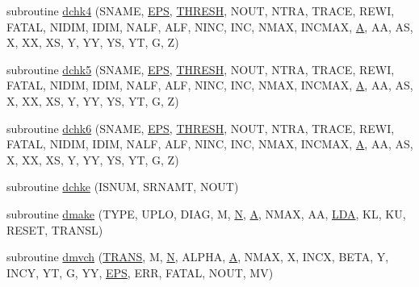 \begin{DoxyCompactItemize}
\item 
subroutine \hyperlink{dblat2_8f_aa8fdd6ba213f5c4bdf7f9ba5e6a1a0e7}{dchk4} (S\+N\+A\+M\+E, \hyperlink{tukey_8c_a6ebf6899d6c1c8b7b9d09be872c05aae}{E\+P\+S}, \hyperlink{zlaqgs_8c_a0656018abfc9fa2821827415f5d5ea57}{T\+H\+R\+E\+S\+H}, N\+O\+U\+T, N\+T\+R\+A, T\+R\+A\+C\+E, R\+E\+W\+I, F\+A\+T\+A\+L, N\+I\+D\+I\+M, I\+D\+I\+M, N\+A\+L\+F, A\+L\+F, N\+I\+N\+C, I\+N\+C, N\+M\+A\+X, I\+N\+C\+M\+A\+X, \hyperlink{classA}{A}, A\+A, A\+S, X, X\+X, X\+S, Y, Y\+Y, Y\+S, Y\+T, G, Z)
\item 
subroutine \hyperlink{dblat2_8f_aa5e1ff12141c4f3001796e7c26fb4f4a}{dchk5} (S\+N\+A\+M\+E, \hyperlink{tukey_8c_a6ebf6899d6c1c8b7b9d09be872c05aae}{E\+P\+S}, \hyperlink{zlaqgs_8c_a0656018abfc9fa2821827415f5d5ea57}{T\+H\+R\+E\+S\+H}, N\+O\+U\+T, N\+T\+R\+A, T\+R\+A\+C\+E, R\+E\+W\+I, F\+A\+T\+A\+L, N\+I\+D\+I\+M, I\+D\+I\+M, N\+A\+L\+F, A\+L\+F, N\+I\+N\+C, I\+N\+C, N\+M\+A\+X, I\+N\+C\+M\+A\+X, \hyperlink{classA}{A}, A\+A, A\+S, X, X\+X, X\+S, Y, Y\+Y, Y\+S, Y\+T, G, Z)
\item 
subroutine \hyperlink{dblat2_8f_add7fe1a057c0b80a7547c153f32fc0d3}{dchk6} (S\+N\+A\+M\+E, \hyperlink{tukey_8c_a6ebf6899d6c1c8b7b9d09be872c05aae}{E\+P\+S}, \hyperlink{zlaqgs_8c_a0656018abfc9fa2821827415f5d5ea57}{T\+H\+R\+E\+S\+H}, N\+O\+U\+T, N\+T\+R\+A, T\+R\+A\+C\+E, R\+E\+W\+I, F\+A\+T\+A\+L, N\+I\+D\+I\+M, I\+D\+I\+M, N\+A\+L\+F, A\+L\+F, N\+I\+N\+C, I\+N\+C, N\+M\+A\+X, I\+N\+C\+M\+A\+X, \hyperlink{classA}{A}, A\+A, A\+S, X, X\+X, X\+S, Y, Y\+Y, Y\+S, Y\+T, G, Z)
\item 
subroutine \hyperlink{dblat2_8f_a9e9fa2f6b42c5bbdde09d50fffaafc4e}{dchke} (I\+S\+N\+U\+M, S\+R\+N\+A\+M\+T, N\+O\+U\+T)
\item 
subroutine \hyperlink{dblat2_8f_a1c65c92d411e657e5fd49db5ea7739b4}{dmake} (T\+Y\+P\+E, U\+P\+L\+O, D\+I\+A\+G, M, \hyperlink{polmisc_8c_a0240ac851181b84ac374872dc5434ee4}{N}, \hyperlink{classA}{A}, N\+M\+A\+X, A\+A, \hyperlink{example__user_8c_ae946da542ce0db94dced19b2ecefd1aa}{L\+D\+A}, K\+L, K\+U, R\+E\+S\+E\+T, T\+R\+A\+N\+S\+L)
\item 
subroutine \hyperlink{dblat2_8f_afbbc0e902d1922bc88fd3de1837756ef}{dmvch} (\hyperlink{superlu__enum__consts_8h_a0c4e17b2d5cea33f9991ccc6a6678d62a1f61e3015bfe0f0c2c3fda4c5a0cdf58}{T\+R\+A\+N\+S}, M, \hyperlink{polmisc_8c_a0240ac851181b84ac374872dc5434ee4}{N}, A\+L\+P\+H\+A, \hyperlink{classA}{A}, N\+M\+A\+X, X, I\+N\+C\+X, B\+E\+T\+A, Y, I\+N\+C\+Y, Y\+T, G, Y\+Y, \hyperlink{tukey_8c_a6ebf6899d6c1c8b7b9d09be872c05aae}{E\+P\+S}, E\+R\+R, F\+A\+T\+A\+L, N\+O\+U\+T, M\+V)

\end{DoxyCompactItemize}
